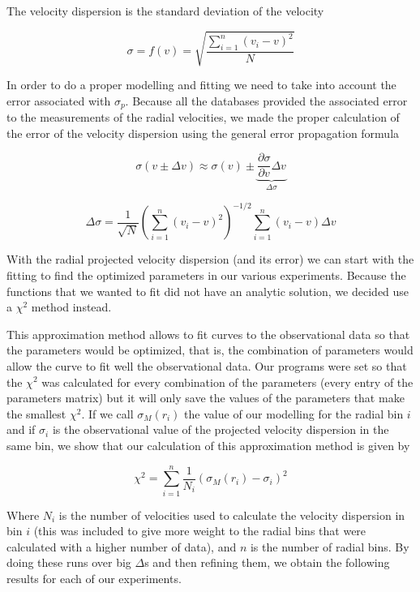 The velocity dispersion is the standard deviation of the velocity

\begin{equation}
\sigma = f(v) = \sqrt{\frac{\sum_{i=1}^{n}\left(v_{i}-v\right)^{2}}{N}}
\end{equation}

In order to do a proper modelling and fitting we need to take into account the error associated with $\sigma_{p}$. Because all the databases provided the associated error to the measurements of the radial velocities, we made the proper calculation of the error of the velocity dispersion using the general error propagation formula

\begin{equation}
\sigma(v\pm\Delta v)\approx \sigma(v)\pm \underbrace{\frac{\partial \sigma}{\partial v}\Delta v}_{\Delta \sigma}
\end{equation}

\begin{equation}
\Delta \sigma = \frac{1}{\sqrt{N}}\left(\sum_{i=1}^{n}\left(v_{i}-v\right)^{2}\right)^{-1/2}\sum_{i=1}^{n}\left(v_{i}-v\right)\Delta v
\end{equation}

With the radial projected velocity dispersion (and its error) we can start with the fitting to find the optimized parameters in our various experiments. Because the functions that we wanted to fit did not have an analytic solution, we decided use a $\chi^{2}$ method instead. 

This approximation method allows to fit curves to the observational data so that the parameters would be optimized, that is, the combination of parameters would allow the curve to fit well the observational data. Our programs were set so that the $\chi^{2}$ was calculated for every combination of the parameters (every entry of the parameters matrix) but it will only save the values of the parameters that make the smallest $\chi^{2}$. If we call $\sigma_{M}(r_{i})$ the value of our modelling for the radial bin $i$ and if $\sigma_{i}$ is the observational value of the projected velocity dispersion in the same bin, we show that our calculation of this approximation method is given by 

\begin{equation}
\chi^{2}=\sum_{i=1}^{n}\frac{1}{N_{i}}{\left(\sigma_{M}\left(r_{i}\right)-\sigma_{i}\right)}^{2}
\end{equation}

Where $N_{i}$ is the number of velocities used to calculate the velocity dispersion in bin $i$ (this was included to give more weight to the radial bins that were calculated with a higher number of data), and $n$ is the number of radial bins. By doing these runs over big $\Delta$s and then refining them, we obtain the following results for each of our experiments.
  
